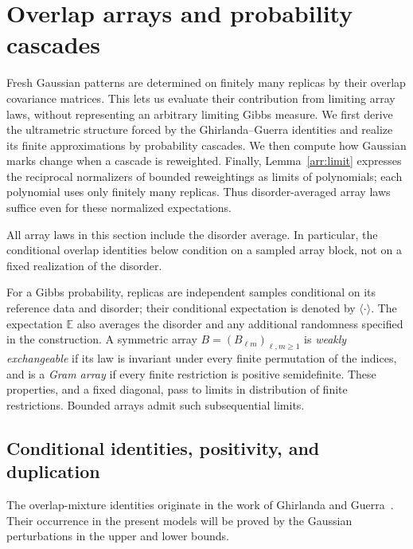 \section{Overlap arrays and probability cascades}
\label{arr:section}

Fresh Gaussian patterns are determined on finitely many replicas by their
overlap covariance matrices.  This lets us evaluate their contribution
from limiting array laws, without representing an arbitrary limiting Gibbs
measure.  We first derive the ultrametric structure forced by the
Ghirlanda--Guerra identities and realize its finite approximations by
probability cascades.  We then compute how Gaussian marks change when a
cascade is reweighted.  Finally, Lemma~\ref{arr:limit} expresses the
reciprocal normalizers of bounded reweightings as limits of polynomials;
each polynomial uses only finitely many replicas.  Thus disorder-averaged
array laws suffice even for these normalized expectations.

All array laws in this section include the disorder average.  In particular,
the conditional overlap identities below condition on a sampled array
block, not on a fixed realization of the disorder.

For a Gibbs probability, replicas are independent samples conditional on its
reference data and disorder; their conditional expectation is denoted by
$\langle\cdot\rangle$.  The expectation $\mathbb E$ also averages the disorder
and any additional randomness specified in the construction.  A symmetric
array $B=(B_{\ell m})_{\ell,m\geq1}$ is \emph{weakly exchangeable} if its law is
invariant under every finite permutation of the indices, and is a
\emph{Gram array} if every finite restriction is positive semidefinite.
These properties, and a fixed diagonal, pass to limits in distribution of
finite restrictions.  Bounded arrays admit such subsequential limits.

\subsection{Conditional identities, positivity, and duplication}

The overlap-mixture identities originate in the work of Ghirlanda and
Guerra~\cite{gg1998}.  Their occurrence in the present models will be
proved by the Gaussian perturbations in the upper and lower bounds.

